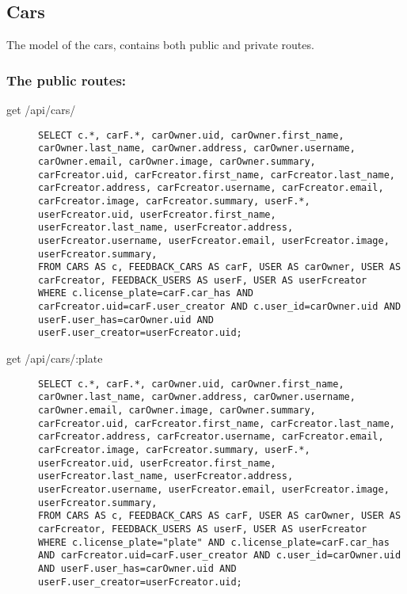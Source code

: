 \documentclass{article}
\begin{document}
\subsection{Cars}
The model of the cars, contains both public and private routes.
\subsubsection{The public routes:}
\begin{description}
\item[get /api/cars/] \mbox{}
\begin{lstlisting}[style=sql]
SELECT c.*, carF.*, carOwner.uid, carOwner.first_name, carOwner.last_name, carOwner.address, carOwner.username, carOwner.email, carOwner.image, carOwner.summary, carFcreator.uid, carFcreator.first_name, carFcreator.last_name, carFcreator.address, carFcreator.username, carFcreator.email, carFcreator.image, carFcreator.summary, userF.*, userFcreator.uid, userFcreator.first_name, userFcreator.last_name, userFcreator.address, userFcreator.username, userFcreator.email, userFcreator.image, userFcreator.summary,
FROM CARS AS c, FEEDBACK_CARS AS carF, USER AS carOwner, USER AS carFcreator, FEEDBACK_USERS AS userF, USER AS userFcreator
WHERE c.license_plate=carF.car_has AND carFcreator.uid=carF.user_creator AND c.user_id=carOwner.uid AND userF.user_has=carOwner.uid AND userF.user_creator=userFcreator.uid;
\end{lstlisting}
\item[get /api/cars/:plate] \mbox{}
\begin{lstlisting}[style=sql]
SELECT c.*, carF.*, carOwner.uid, carOwner.first_name, carOwner.last_name, carOwner.address, carOwner.username, carOwner.email, carOwner.image, carOwner.summary, carFcreator.uid, carFcreator.first_name, carFcreator.last_name, carFcreator.address, carFcreator.username, carFcreator.email, carFcreator.image, carFcreator.summary, userF.*, userFcreator.uid, userFcreator.first_name, userFcreator.last_name, userFcreator.address, userFcreator.username, userFcreator.email, userFcreator.image, userFcreator.summary,
FROM CARS AS c, FEEDBACK_CARS AS carF, USER AS carOwner, USER AS carFcreator, FEEDBACK_USERS AS userF, USER AS userFcreator
WHERE c.license_plate="plate" AND c.license_plate=carF.car_has AND carFcreator.uid=carF.user_creator AND c.user_id=carOwner.uid AND userF.user_has=carOwner.uid AND userF.user_creator=userFcreator.uid;
\end{lstlisting}
\end{description}
\end{document}
